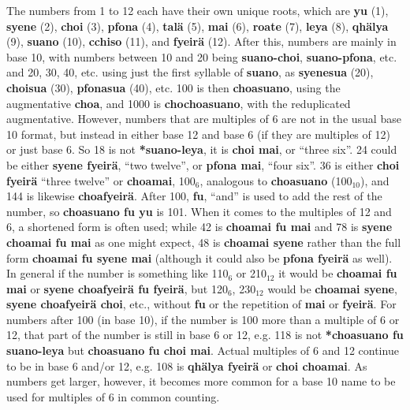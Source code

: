 \documentclass{article}
\begin{document}
The numbers from 1 to 12 each have their own unique roots, which are \textbf{yu} (1), \textbf{syene} (2), \textbf{choi} (3), \textbf{pfona} (4), \textbf{tal\"a} (5), \textbf{mai} (6), \textbf{roate} (7), \textbf{leya} (8), \textbf{qh\"alya} (9), \textbf{suano} (10), \textbf{cchiso} (11), and \textbf{fyeir\"a} (12).  After this, numbers are mainly in base 10, with numbers between 10 and 20 being \textbf{suano-choi}, \textbf{suano-pfona}, etc. and 20, 30, 40, etc. using just the first syllable of \textbf{suano}, as \textbf{syenesua} (20), \textbf{choisua} (30), \textbf{pfonasua} (40), etc.  100 is then \textbf{choasuano}, using the augmentative \textbf{choa}, and 1000 is \textbf{chochoasuano}, with the reduplicated augmentative.  However, numbers that are multiples of 6 are not in the usual base 10 format, but instead in either base 12 and base 6 (if they are multiples of 12) or just base 6.  So 18 is not \textbf{*suano-leya}, it is \textbf{choi mai}, or ``three six''.  24 could be either \textbf{syene fyeir\"a}, ``two twelve'', or \textbf{pfona mai}, ``four six''.  36 is either \textbf{choi fyeir\"a} ``three twelve'' or \textbf{choamai}, 100$_6$, analogous to \textbf{choasuano} (100$_{10}$), and 144 is likewise \textbf{choafyeir\"a}.  After 100, \textbf{fu}, ``and'' is used to add the rest of the number, so \textbf{choasuano fu yu} is 101.  When it comes to the multiples of 12 and 6, a shortened form is often used; while 42 is \textbf{choamai fu mai} and 78 is \textbf{syene choamai fu mai} as one might expect, 48 is \textbf{choamai syene} rather than the full form \textbf{choamai fu syene mai} (although it could also be \textbf{pfona fyeir\"a} as well).  In general if the number is something like 110$_6$ or 210$_{12}$ it would be \textbf{choamai fu mai} or \textbf{syene choafyeir\"a fu fyeir\"a}, but 120$_6$, 230$_{12}$ would be \textbf{choamai syene}, \textbf{syene choafyeir\"a choi}, etc., without \textbf{fu} or the repetition of \textbf{mai} or \textbf{fyeir\"a}.  For numbers after 100 (in base 10), if the number is 100 more than a multiple of 6 or 12, that part of the number is still in base 6 or 12, e.g. 118 is not \textbf{*choasuano fu suano-leya} but \textbf{choasuano fu choi mai}.  Actual multiples of 6 and 12 continue to be in base 6 and/or 12, e.g. 108 is \textbf{qh\"alya fyeir\"a} or \textbf{choi choamai}.  As numbers get larger, however, it becomes more common for a base 10 name to be used for multiples of 6 in common counting.
\end{document}
